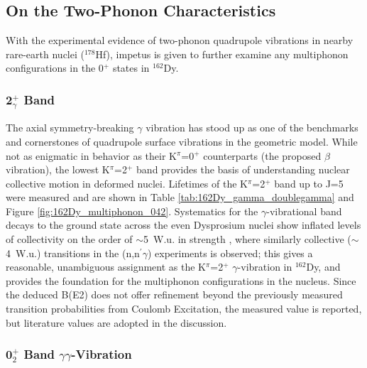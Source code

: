 \subsection{On the Two-Phonon Characteristics}
With the experimental evidence of two-phonon quadrupole vibrations in nearby rare-earth nuclei ($^{178}$Hf), impetus is given to further examine any multiphonon configurations in the 0$^+$ states in $^{162}$Dy. 

\subsubsection{2$^+_\gamma$ Band}
The axial symmetry-breaking $\gamma$ vibration has stood up as one of the benchmarks and cornerstones of quadrupole surface vibrations in the geometric model. While not as enigmatic in behavior as their K$^\pi$=0$^+$ counterparts (the proposed $\beta$ vibration), the lowest K$^\pi$=2$^+$ band provides the basis of understanding nuclear collective motion in deformed nuclei. Lifetimes of the K$^\pi$=2$^+$ band up to J=5 were measured and are shown in Table \ref{tab:162Dy_gamma_doublegamma} and Figure \ref{fig:162Dy_multiphonon_042}. Systematics for the $\gamma$-vibrational band decays to the ground state across the even Dysprosium nuclei show inflated levels of collectivity on the order of $\sim$5~W.u. in strength \cite{GROTDAL1968385,McGowan_BE2_1981}, where similarly collective ($\sim$4~W.u.) transitions in the (n,n$^\prime\gamma$) experiments is observed; this gives a reasonable, unambiguous assignment as the K$^\pi$=2$^+$ $\gamma$-vibration in $^{162}$Dy, and provides the foundation for the multiphonon configurations in the nucleus. Since the deduced B(E2) does not offer refinement beyond the previously measured transition probabilities from Coulomb Excitation, the measured value is reported, but literature values are adopted in the discussion.
\subsubsection{0$^+_2$ Band $\gamma\gamma$-Vibration}

